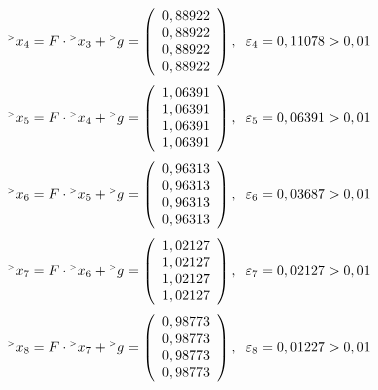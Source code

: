 \documentclass[12pt]{article}
\begin{document}
\begin{equation*}
	{}^{\mathsmaller{>}} x_{4}= F \cdot 
	{}^{\mathsmaller{>}} x_{3} +  {}^{\mathsmaller{>}} g = 
	\left(
	\begin{array}{c}
		0,88922 \\ 0,88922 \\ 0,88922 \\ 0,88922 \\ 
	\end{array}
	\right), \hspace{0.2cm}
	\varepsilon_4 = 0,11078 > 0,01
\end{equation*}
\begin{equation*}
	{}^{\mathsmaller{>}} x_{5}= F \cdot 
	{}^{\mathsmaller{>}} x_{4} +  {}^{\mathsmaller{>}} g = 
	\left(
	\begin{array}{c}
		1,06391 \\ 1,06391 \\ 1,06391 \\ 1,06391 \\ 
	\end{array}
	\right), \hspace{0.2cm}
	\varepsilon_5 = 0,06391 > 0,01
\end{equation*}
\begin{equation*}
	{}^{\mathsmaller{>}} x_{6}= F \cdot 
	{}^{\mathsmaller{>}} x_{5} +  {}^{\mathsmaller{>}} g = 
	\left(
	\begin{array}{c}
		0,96313 \\ 0,96313 \\ 0,96313 \\ 0,96313 \\ 
	\end{array}
	\right), \hspace{0.2cm}
	\varepsilon_6 = 0,03687 > 0,01
\end{equation*}
\begin{equation*}
	{}^{\mathsmaller{>}} x_{7}= F \cdot 
	{}^{\mathsmaller{>}} x_{6} +  {}^{\mathsmaller{>}} g = 
	\left(
	\begin{array}{c}
		1,02127 \\ 1,02127 \\ 1,02127 \\ 1,02127 \\ 
	\end{array}
	\right), \hspace{0.2cm}
	\varepsilon_7 = 0,02127 > 0,01
\end{equation*}
\begin{equation*}
	{}^{\mathsmaller{>}} x_{8}= F \cdot 
	{}^{\mathsmaller{>}} x_{7} +  {}^{\mathsmaller{>}} g = 
	\left(
	\begin{array}{c}
		0,98773 \\ 0,98773 \\ 0,98773 \\ 0,98773 \\ 
	\end{array}
	\right), \hspace{0.2cm}
	\varepsilon_8 = 0,01227 > 0,01
\end{equation*}
\end{document}
